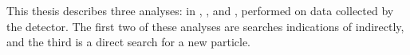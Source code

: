 This thesis describes three analyses: in , , and ,
performed on data collected by the \lhcb detector.
The first two of these analyses are searches indications of \np indirectly, and the third is a
direct search for a new particle.




\clearpage





%
%
%
